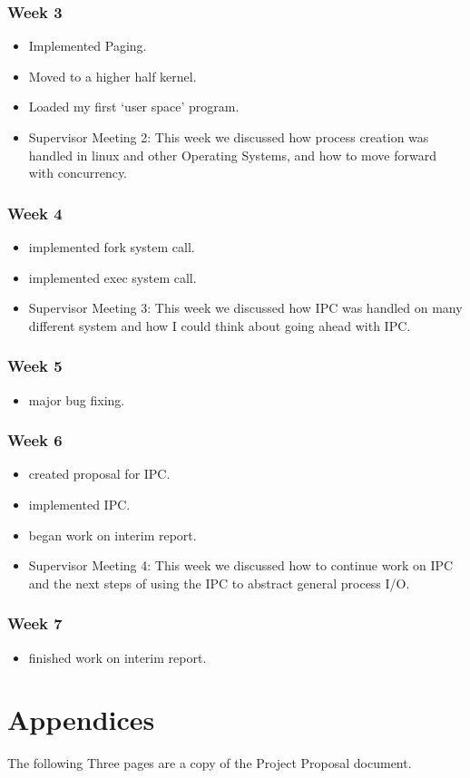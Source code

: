 \documentclass[a4paper]{report}
\begin{document}
\subsection*{Week 3}
\begin{itemize}
\item Implemented Paging.
\item Moved to a higher half kernel.
\item Loaded my first `user space' program.
\item Supervisor Meeting 2: This week we discussed how process creation was handled in linux and other Operating Systems, and how to move forward with concurrency.
\end{itemize}

\subsection*{Week 4}
\begin{itemize}
\item implemented fork system call.
\item implemented exec system call.
\item Supervisor Meeting 3: This week we discussed how IPC was handled on many different system and how I could think about going ahead with IPC.
\end{itemize}

\subsection*{Week 5}
\begin{itemize}
\item major bug fixing.
\end{itemize}

\subsection*{Week 6}
\begin{itemize}
\item created proposal for IPC.
\item implemented IPC.
\item began work on interim report.
\item Supervisor Meeting 4: This week we discussed how to continue work on IPC and the next steps of using the IPC to abstract general process I/O.
\end{itemize}

\subsection*{Week 7}
\begin{itemize}
\item finished work on interim report.
\end{itemize}

\chapter*{Appendices}

The following Three pages are a copy of the Project Proposal document.








\end{document}
